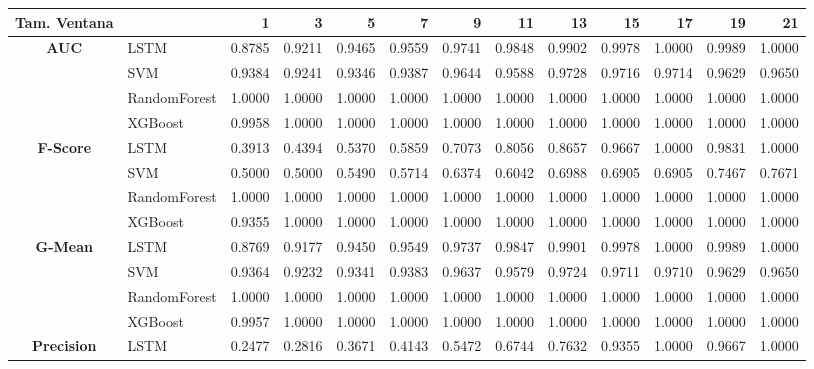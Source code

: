 \begin{table}[h]
	\centering
	\begin{adjustbox}{max width=15cm}
		\begin{tabular}{|c|l|r|r|r|r|r|r|r|r|r|r|r|}
			\hline
			\textbf{Tam. Ventana} &         &      1  &      3  &      5  &      7  &      9  &      11 &      13 &      15 &      17 &      19 &      21 \\
			\hline
			\textbf{AUC} & LSTM &  0.8785 &  0.9211 &  0.9465 &  0.9559 &  0.9741 &  0.9848 &  0.9902 &  0.9978 &  1.0000 &  0.9989 &  1.0000 \\
			& SVM &  0.9384 &  0.9241 &  0.9346 &  0.9387 &  0.9644 &  0.9588 &  0.9728 &  0.9716 &  0.9714 &  0.9629 &  0.9650 \\
			& RandomForest &  1.0000 &  1.0000 &  1.0000 &  1.0000 &  1.0000 &  1.0000 &  1.0000 &  1.0000 &  1.0000 &  1.0000 &  1.0000 \\
			& XGBoost &  0.9958 &  1.0000 &  1.0000 &  1.0000 &  1.0000 &  1.0000 &  1.0000 &  1.0000 &  1.0000 &  1.0000 &  1.0000 \\
			\hline
			\textbf{F-Score} & LSTM &  0.3913 &  0.4394 &  0.5370 &  0.5859 &  0.7073 &  0.8056 &  0.8657 &  0.9667 &  1.0000 &  0.9831 &  1.0000 \\
			& SVM &  0.5000 &  0.5000 &  0.5490 &  0.5714 &  0.6374 &  0.6042 &  0.6988 &  0.6905 &  0.6905 &  0.7467 &  0.7671 \\
			& RandomForest &  1.0000 &  1.0000 &  1.0000 &  1.0000 &  1.0000 &  1.0000 &  1.0000 &  1.0000 &  1.0000 &  1.0000 &  1.0000 \\
			& XGBoost &  0.9355 &  1.0000 &  1.0000 &  1.0000 &  1.0000 &  1.0000 &  1.0000 &  1.0000 &  1.0000 &  1.0000 &  1.0000 \\
			\hline
			\textbf{G-Mean} & LSTM &  0.8769 &  0.9177 &  0.9450 &  0.9549 &  0.9737 &  0.9847 &  0.9901 &  0.9978 &  1.0000 &  0.9989 &  1.0000 \\
			& SVM &  0.9364 &  0.9232 &  0.9341 &  0.9383 &  0.9637 &  0.9579 &  0.9724 &  0.9711 &  0.9710 &  0.9629 &  0.9650 \\
			& RandomForest &  1.0000 &  1.0000 &  1.0000 &  1.0000 &  1.0000 &  1.0000 &  1.0000 &  1.0000 &  1.0000 &  1.0000 &  1.0000 \\
			& XGBoost &  0.9957 &  1.0000 &  1.0000 &  1.0000 &  1.0000 &  1.0000 &  1.0000 &  1.0000 &  1.0000 &  1.0000 &  1.0000 \\
			\hline
			\textbf{Precision} & LSTM &  0.2477 &  0.2816 &  0.3671 &  0.4143 &  0.5472 &  0.6744 &  0.7632 &  0.9355 &  1.0000 &  0.9667 &  1.0000 \\

\end{tabular}
\end{adjustbox}
\end{table}
